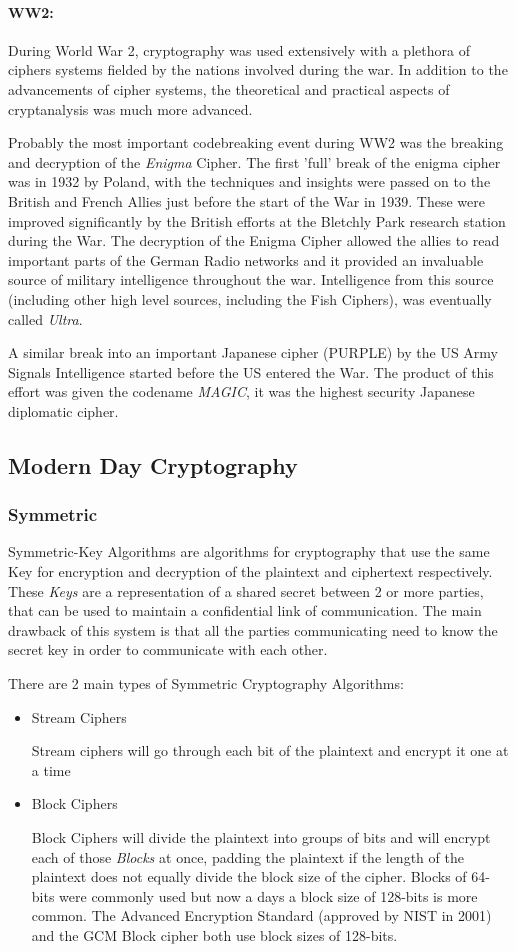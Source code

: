 \paragraph{WW2:}
During World War 2, cryptography was used extensively with a plethora of ciphers systems fielded by the nations involved during the war. In addition to the advancements of cipher systems, the theoretical and practical aspects of cryptanalysis was much more advanced.

Probably the most important codebreaking event during WW2 was the breaking and decryption of the \textit{Enigma} Cipher. The first 'full' break of the enigma cipher was in 1932 by Poland, with the techniques and insights were passed on to the British and French Allies just before the start of the War in 1939. These were improved significantly by the British efforts at the Bletchly Park research station during the War. The decryption of the Enigma Cipher allowed the allies to read important parts of the German Radio networks and it provided an invaluable source of military intelligence throughout the war. Intelligence from this source (including other high level sources, including the Fish Ciphers), was eventually called \textit{Ultra}. 

A similar break into an important Japanese cipher (PURPLE) by the US Army Signals Intelligence started before the US entered the War. The product of this effort was given the codename \textit{MAGIC}, it was the highest security Japanese diplomatic cipher.

\subsection{Modern Day Cryptography}
\subsubsection{Symmetric}
Symmetric-Key Algorithms are algorithms for cryptography that use the same Key for encryption and decryption of the plaintext and ciphertext respectively. These \textit{Keys} are a representation of a shared secret between 2 or more parties, that can be used to maintain a confidential link of communication. The main drawback of this system is that all the parties communicating need to know the secret key in order to communicate with each other.

There are 2 main types of Symmetric Cryptography Algorithms:
\begin{itemize}
\item{Stream Ciphers

Stream ciphers will go through each bit of the plaintext and encrypt it one at a time
}
\item{Block Ciphers

Block Ciphers will divide the plaintext into groups of bits and will encrypt each of those \textit{Blocks} at once, padding the plaintext if the length of the plaintext does not equally divide the block size of the cipher. Blocks of 64-bits were commonly used but now a days a block size of 128-bits is more common. The Advanced Encryption Standard (approved by NIST in 2001) and the GCM Block cipher both use block sizes of 128-bits.
}
\end{itemize}

